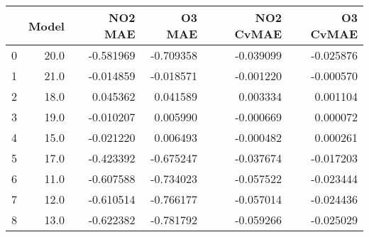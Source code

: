 \begin{tabular}{lrrrrr}
\toprule
{} &  Model &   NO2 MAE &    O3 MAE &  NO2 CvMAE &  O3 CvMAE \\
\midrule
0 &   20.0 & -0.581969 & -0.709358 &  -0.039099 & -0.025876 \\
1 &   21.0 & -0.014859 & -0.018571 &  -0.001220 & -0.000570 \\
2 &   18.0 &  0.045362 &  0.041589 &   0.003334 &  0.001104 \\
3 &   19.0 & -0.010207 &  0.005990 &  -0.000669 &  0.000072 \\
4 &   15.0 & -0.021220 &  0.006493 &  -0.000482 &  0.000261 \\
5 &   17.0 & -0.423392 & -0.675247 &  -0.037674 & -0.017203 \\
6 &   11.0 & -0.607588 & -0.734023 &  -0.057522 & -0.023444 \\
7 &   12.0 & -0.610514 & -0.766177 &  -0.057014 & -0.024436 \\
8 &   13.0 & -0.622382 & -0.781792 &  -0.059266 & -0.025029 \\
\bottomrule
\end{tabular}
